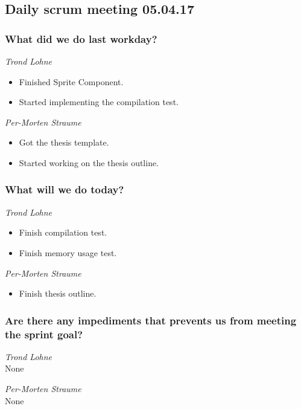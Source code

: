 \documentclass{article}
\begin{document}
\begin{center}
\subsection*{Daily scrum meeting 05.04.17}
\end{center}
\bigskip


\subsubsection*{What did we do last workday?}

\noindent\textit{Trond Lohne}
\begin{itemize}
	\item 
	Finished Sprite Component.
	
	\item 
	Started implementing the compilation test.
\end{itemize}

\medskip

\noindent\textit{Per-Morten Straume}
\begin{itemize}
	\item 
	Got the thesis template.
	
	\item 
	Started working on the thesis outline.
\end{itemize}


\subsubsection*{What will we do today?}

\noindent\textit{Trond Lohne}
\begin{itemize}
	\item 
	Finish compilation test.
	
	\item 
	Finish memory usage test.
\end{itemize}

\medskip

\noindent\textit{Per-Morten Straume}
\begin{itemize}
	\item 
	Finish thesis outline.
\end{itemize}


\subsubsection*{Are there any impediments that prevents us from meeting the sprint goal?}

\noindent\textit{Trond Lohne}\\
None

\medskip

\noindent\textit{Per-Morten Straume}\\
None
\end{document}
